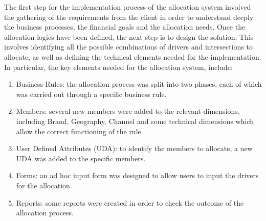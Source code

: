 \documentclass[12pt,a4paper,openright,twoside]{book}
\begin{document}
The first step for the implementation process of the allocation system involved the gathering of the requirements from the client in order to understand deeply the business processes, the financial goals and the allocation needs.
%
Once the allocation logics have been defined, the next step is to design the solution.
%
This involves identifying all the possible combinations of drivers and intersections to allocate, as well as defining the technical elements needed for the implementation.
%
In particular, the key elements needed for the allocation system, include:

\begin{enumerate}
    \item Business Rules: the allocation process was split into two phases, each of which was carried out through a specific business rule.
    \item Members: several new members were added to the relevant dimensions, including Brand, Geography, Channel and some technical dimensions which allow the correct functioning of the rule.
    \item User Defined Attributes (UDA): to identify the members to allocate, a new UDA was added to the specific members.
    \item Forms: an ad hoc input form was designed to allow users to input the drivers for the allocation.
    \item Reports: some reports were created in order to check the outcome of the allocation process.
\end{enumerate}
\end{document}
